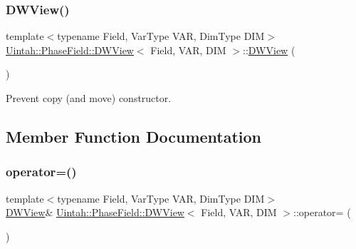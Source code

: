\subsubsection{\texorpdfstring{D\+W\+View()}{DWView()}\hspace{0.1cm}{\footnotesize\ttfamily [3/3]}}
{\footnotesize\ttfamily template$<$typename Field, Var\+Type V\+AR, Dim\+Type D\+IM$>$ \\
\hyperlink{classUintah_1_1PhaseField_1_1DWView}{Uintah\+::\+Phase\+Field\+::\+D\+W\+View}$<$ Field, V\+AR, D\+IM $>$\+::\hyperlink{classUintah_1_1PhaseField_1_1DWView}{D\+W\+View} (\begin{DoxyParamCaption}\item[{const \hyperlink{classUintah_1_1PhaseField_1_1DWView}{D\+W\+View}$<$ Field, V\+AR, D\+IM $>$ \&}]{ }\end{DoxyParamCaption})\hspace{0.3cm}{\ttfamily [delete]}}



Prevent copy (and move) constructor. 



\subsection{Member Function Documentation}
\mbox{\label{classUintah_1_1PhaseField_1_1DWView_a71239df8adf25f9af2d5f3dc4754722c}} 
\subsubsection{\texorpdfstring{operator=()}{operator=()}}
{\footnotesize\ttfamily template$<$typename Field, Var\+Type V\+AR, Dim\+Type D\+IM$>$ \\
\hyperlink{classUintah_1_1PhaseField_1_1DWView}{D\+W\+View}\& \hyperlink{classUintah_1_1PhaseField_1_1DWView}{Uintah\+::\+Phase\+Field\+::\+D\+W\+View}$<$ Field, V\+AR, D\+IM $>$\+::operator= (\begin{DoxyParamCaption}\item[{const \hyperlink{classUintah_1_1PhaseField_1_1DWView}{D\+W\+View}$<$ Field, V\+AR, D\+IM $>$ \&}]{ }\end{DoxyParamCaption})\hspace{0.3cm}{\ttfamily [delete]}}



